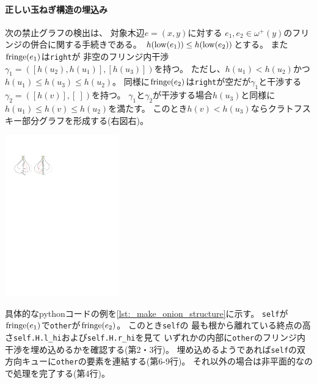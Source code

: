 \begin{paracol}{2}
\paragraph{正しい玉ねぎ構造の埋込み}
次の禁止グラフの検出は、
対象木辺$e=(x, y)$に対する
$e_1, e_2 \in \omega^+(y)$のフリンジの併合に関する手続きである。
$h(\operatorname{low}(e_1)) \leq h(\operatorname{low}(e_2))$とする。
また$\operatorname{fringe}(e_1)$は{\tt right}が
非空のフリンジ内干渉$\gamma_1=([h(u_2), h(u_1)], [h(u_3)])$を持つ。
ただし、$h(u_1) < h(u_2)$かつ$h(u_1) \leq h(u_3) \leq h(u_2)$。
同様に$\operatorname{fringe}(e_2)$は{\tt right}が空だが$\gamma_1$と干渉する
$\gamma_2=([h(v)], [~])$を持つ。
$\gamma_1$と$\gamma_2$が干渉する場合$h(u_3)$と同様に
$h(u_1) \leq h(v) \leq h(u_2)$を満たす。
このとき$h(v) < h(u_3)$ならクラトフスキー部分グラフを形成する(右図右)。

\switchcolumn
\vspace{1.5\intextsep}
\centering
\includegraphics[width=0.37\textwidth]{figures/make_onion.pdf}
\end{paracol}

具体的なpythonコードの例を\lstrefname\ref{lst:_make_onion_structure}に示す。
{\tt self}が$\operatorname{fringe}(e_1)$で{\tt other}が$\operatorname{fringe}(e_2)$。
このとき{\tt self}の
最も根から離れている終点の高さ{\tt self.H.l\_hi}および{\tt self.H.r\_hi}を見て
いずれかの内部に{\tt other}のフリンジ内干渉を埋め込めるかを確認する(第2・3行)。
埋め込めるようであれば{\tt self}の双方向キューに{\tt other}の要素を連結する(第6-9行)。
それ以外の場合は非平面的なので処理を完了する(第4行)。





